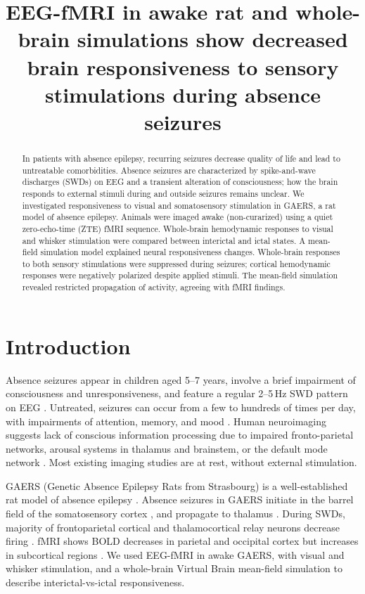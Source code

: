 \documentclass[11pt]{article}
\title{EEG-fMRI in awake rat and whole-brain simulations show decreased brain responsiveness to sensory stimulations during absence seizures}
\author{}
\date{}
\begin{document}
\maketitle

\begin{abstract}
In patients with absence epilepsy, recurring seizures decrease quality of life and lead to untreatable comorbidities. Absence seizures are characterized by spike-and-wave discharges (SWDs) on EEG and a transient alteration of consciousness; how the brain responds to external stimuli during and outside seizures remains unclear. We investigated responsiveness to visual and somatosensory stimulation in GAERS, a rat model of absence epilepsy. Animals were imaged awake (non-curarized) using a quiet zero-echo-time (ZTE) fMRI sequence. Whole-brain hemodynamic responses to visual and whisker stimulation were compared between interictal and ictal states. A mean-field simulation model explained neural responsiveness changes. Whole-brain responses to both sensory stimulations were suppressed during seizures; cortical hemodynamic responses were negatively polarized despite applied stimuli. The mean-field simulation revealed restricted propagation of activity, agreeing with fMRI findings.
\end{abstract}

\section{Introduction}
Absence seizures appear in children aged 5--7 years, involve a brief impairment of consciousness and unresponsiveness, and feature a regular 2--5\,Hz SWD pattern on EEG \citep{loiseau1995,szaflarski2010}. Untreated, seizures can occur from a few to hundreds of times per day, with impairments of attention, memory, and mood \citep{crunelli2020}. Human neuroimaging suggests lack of conscious information processing due to impaired fronto-parietal networks, arousal systems in thalamus and brainstem, or the default mode network \citep{blumenfeld2012,luo2011}. Most existing imaging studies are at rest, without external stimulation.

GAERS (Genetic Absence Epilepsy Rats from Strasbourg) is a well-established rat model of absence epilepsy \citep{depaulis2016}. Absence seizures in GAERS initiate in the barrel field of the somatosensory cortex \citep{david2008,meeren2002,polack2007}, and propagate to thalamus \citep{huguenard2019}. During SWDs, majority of frontoparietal cortical and thalamocortical relay neurons decrease firing \citep{mccafferty2023}. fMRI shows BOLD decreases in parietal and occipital cortex but increases in subcortical regions \citep{david2008,mccafferty2023}. We used EEG-fMRI in awake GAERS, with visual and whisker stimulation, and a whole-brain Virtual Brain mean-field simulation \citep{divolo2019} to describe interictal-vs-ictal responsiveness.
\end{document}

